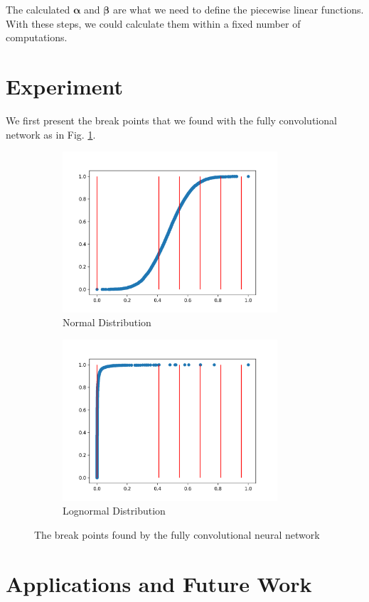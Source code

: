 The calculated $\boldsymbol{\alpha}$ and $\boldsymbol{\beta}$ are what we need to define the piecewise linear functions. With these steps, we could calculate them within a fixed number of computations. 

\section{Experiment}

We first present the break points that we found with the fully convolutional network as in Fig. \ref{fig:fcn_betas_found}.

\begin{figure}[t]
\begin{subfigure}[b]{0.5\textwidth}\includegraphics[width=8cm]{graphs/fcn/normal}
\caption{Normal Distribution}
\end{subfigure}	
\hfill
\begin{subfigure}[b]{0.5\textwidth}\includegraphics[width=8cm]{graphs/fcn/lognormal}
\caption{Lognormal Distribution}
\end{subfigure}
\caption{The break points found by the fully convolutional neural network}
\label{fig:fcn_betas_found}
\end{figure}

\section{Applications and Future Work}

